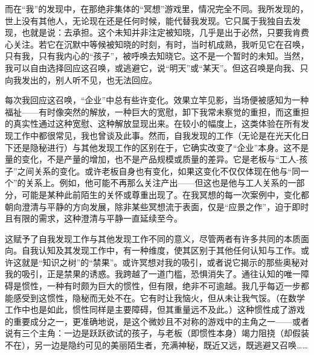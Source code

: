 而在“我”的发现中，在那绝非集体的“冥想”游戏里，情况完全不同。我所发现的，世上没有其他人，无论现在还是任何时候，能代替我发现。它只属于我独自去发现，也就是说：去承担。这个未知并非注定被知晓，几乎是出于必然，只要我肯费心关注。若它在沉默中等候被知晓的时刻，有时，当时机成熟，我听见它在召唤，只有我，只有我内心的“孩子”，被呼唤去知晓它。这不是一个暂时的未知。当然，我可以自由选择回应这召唤，或逃避它，说“明天”或“某天”。但这召唤是向我、只向我发出的，别人听不见，也无法回应。

每次我回应这召唤，“企业”中总有些许变化。效果立竿见影，当场便被感知为一种福祉——有时像突然的解放，一种巨大的宽慰，卸下我常未察觉的重担，而这重担的真实性通过这种宽慰、这种解放显现出来。在较小的幅度上，这类体验在所有发现工作中都很常见，我也曾谈及此事。然而，自我发现的工作（无论是在光天化日下还是隐秘进行）与其他发现工作的区别在于，它确实改变了“企业”本身。这不是量的变化，不是产量的增加，也不是产品规模或质量的差异。它是老板与“工人-孩子”之间关系的变化。或许老板自身也有变化，如果这变化不仅仅体现在他与“同一个”的关系上。例如，他可能不再那么关注产出——但这也是他与工人关系的一部分，可能是某种此前陌生的关怀或尊重出现了。在我冥想的每一次案例中，变化都朝向澄清与平静的方向发展，除非某些冥想流于表面，仅是“应景之作”，迫于即时且有限的需求，这种澄清与平静一直延续至今。

这赋予了自我发现工作与其他发现工作不同的意义，尽管两者有许多共同的本质面向。自我认知及其发现工作中，有一种维度，使其区别于其他任何认知与工作。或许这就是“知识之树”的“禁果”。或许冥想对我的吸引，或者说它揭示的那些奥秘对我的吸引，正是禁果的诱惑。我跨越了一道门槛，恐惧消失了。通往认知的唯一障碍是惯性，一种有时颇为巨大的惯性，但有限，绝非不可逾越。我几乎每迈一步都能感受到这惯性，隐秘而无处不在。它有时让我恼火，但从未让我气馁。（在数学工作中也是如此，惯性同样是主要障碍，但其重量远不及此。）这种惯性成了游戏的重要成分之一，更准确地说，是这个微妙且不对称的游戏中的主角之一——或者说有三个主角：一边是跃跃欲试的孩子，与老板（即惯性本身）竭力阻挠（却假装不在），另一边是隐约可见的美丽陌生者，充满神秘，既近又远，既逃避又召唤……